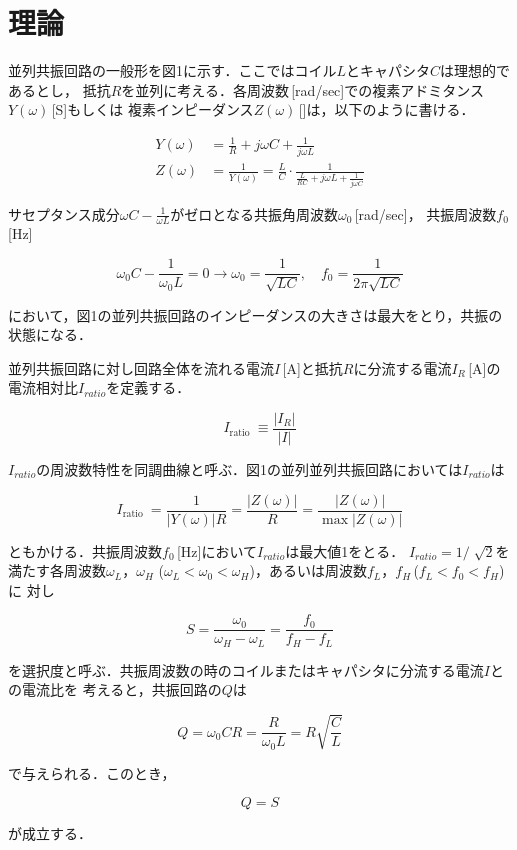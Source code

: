 
\section{理論}

並列共振回路の一般形を図1に示す．ここではコイル$L$とキャパシタ$C$は理想的であるとし，
抵抗$R$を並列に考える．各周波数\omega\,[rad/sec]での複素アドミタンス$Y(\omega)$\,[S]もしくは
複素インピーダンス$Z(\omega)$\,[\Omega]は，以下のように書ける．

$$
\begin{aligned}
Y(\omega) &=\frac{1}{R}+j \omega C+\frac{1}{j \omega L} \\
Z(\omega) &=\frac{1}{Y(\omega)}=\frac{L}{C} \cdot \frac{1}{\frac{L}{R C}+j \omega L+\frac{1}{j \omega C}}
\end{aligned}
$$

サセプタンス成分$\omega C-\frac{1}{\omega L}$がゼロとなる共振角周波数$\omega_0$\,[rad/sec]，
共振周波数$f_0$\,[Hz]

$$
\omega_0 C-\frac{1}{\omega_0 L}=0 \longrightarrow \omega_0=\frac{1}{\sqrt{L C}}, \quad f_0=\frac{1}{2 \pi \sqrt{L C}}
$$

において，図1の並列共振回路のインピーダンスの大きさは最大をとり，共振の状態になる．

並列共振回路に対し回路全体を流れる電流$I$\,[A]と抵抗$R$に分流する電流$I_R$\,[A]の
電流相対比$I_{ratio}$を定義する．

$$
I_{\text {ratio }} \equiv \frac{\left|I_R\right|}{|I|}
$$

$I_{ratio}$の周波数特性を同調曲線と呼ぶ．図1の並列並列共振回路においては$I_{ratio}$は

$$
I_{\text {ratio }}=\frac{1}{|Y(\omega)| R}=\frac{|Z(\omega)|}{R}=\frac{|Z(\omega)|}{\max |Z(\omega)|}
$$

ともかける．共振周波数$f_0$\,[Hz]において$I_{ratio}$は最大値1をとる．
$I_{ratio} = 1 / \sqrt[]{2}$を満たす各周波数$\omega_L$，$\omega_H$
($\omega_L < \omega_0 < \omega_H$)，あるいは周波数$f_L$，$f_H$\,($f_L < f_0 < f_H$)に
対し

$$
S=\frac{\omega_0}{\omega_H-\omega_L}=\frac{f_0}{f_H-f_L}
$$

を選択度と呼ぶ．共振周波数の時のコイルまたはキャパシタに分流する電流$I$との電流比を
考えると，共振回路の$Q$は

$$
Q=\omega_0 C R=\frac{R}{\omega_0 L}=R \sqrt{\frac{C}{L}}
$$

で与えられる．このとき，

$$
Q=S
$$

が成立する．
